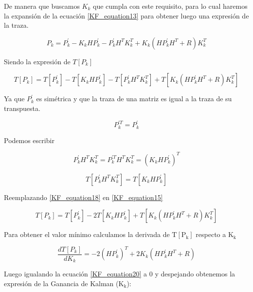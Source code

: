 \documentclass[10pt,a4paper]{article}
\begin{document}
De manera que buscamos $K_k$ que cumpla con este requisito, para lo cual haremos
la expansión de la ecuación \ref{KF_equation13}  para obtener luego una
expresión de la traza.

\begin{equation}
    P_k = P^\prime_k - K_k H P^\prime_k - P^\prime_k H^T K^T_k + K_k (H P^\prime_k H^T + R) K^T_k
    \label{KF_equation14}
\end{equation}	

Siendo la expresión de $T[P_k]$

\begin{equation}
    T[P_k] = T[P^\prime_k] - T[K_k H P^\prime_k] - T[P^\prime_k H^T K^T_k] + T[K_k (H P^\prime_k H^T + R) K^T_k]
    \label{KF_equation15}
\end{equation}	

Ya que $P^\prime_k$ es simétrica  y que la traza de una matriz es igual a la
traza de su transpuesta.

\begin{equation}
    P^{\prime T}_k  = P^\prime_k
    \label{KF_equation16}
\end{equation}	

\noindent Podemos escribir

\begin{equation}
    P^\prime_k H^T K^T_k = P^{\prime T}_k H^T K^T_k = (K_k H P^\prime_k )^T
    \label{KF_equation17}
\end{equation}	

\begin{equation}
    T[P^\prime_k H^T K^T_k] = T[K_k H P^\prime_k]
    \label{KF_equation18}
\end{equation}	

Reemplazando \ref{KF_equation18} en \ref{KF_equation15}

\begin{equation}
    T[P_k] = T[P^\prime_k] -2 T[K_k H P^\prime_k] + T[K_k (H P^\prime_k H^T + R) K^T_k]
    \label{KF_equation19}
\end{equation}	

\noindent Para obtener el valor mínimo calculamos la derivada de 
$\mathrm{T[P_k]}$ respecto a $\mathrm{K_k}$

\begin{equation}
    \frac{dT[P_k]}{dK_k} = -2 (H P^\prime_k)^T + 2K_k (H P^\prime_k H^T + R)
    \label{KF_equation20}
\end{equation}	

\noindent Luego igualando la ecuación \ref{KF_equation20} a 0 y despejando 
obtenemos la expresión de la Ganancia de Kalman ($\mathrm{K_k}$):
\end{document}
